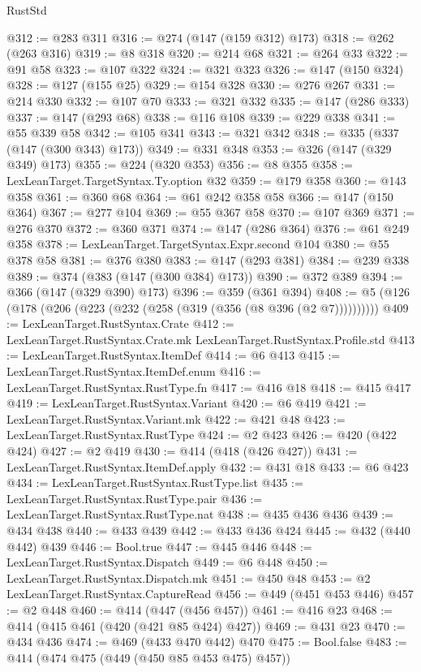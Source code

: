 \begin{lexlean}{RustStd}
\begin{coremodule}
{\begin{coremodule}
{{{{{{{{{{{{{@312 := @283 @311
@316 := @274 (@147 (@159 @312) @173)
@318 := @262 (@263 @316)
@319 := @8 @318
@320 := @214 @68
@321 := @264 @33
@322 := @91 @58
@323 := @107 @322
@324 := @321 @323
@326 := @147 (@150 @324)
@328 := @127 (@155 @25)
@329 := @154 @328
@330 := @276 @267
@331 := @214 @330
@332 := @107 @70
@333 := @321 @332
@335 := @147 (@286 @333)
@337 := @147 (@293 @68)
@338 := @116 @108
@339 := @229 @338
@341 := @55 @339 @58
@342 := @105 @341
@343 := @321 @342
@348 := @335 (@337 (@147 (@300 @343) @173))
@349 := @331 @348
@353 := @326 (@147 (@329 @349) @173)
@355 := @224 (@320 @353)
@356 := @8 @355
@358 := LexLeanTarget.TargetSyntax.Ty.option @32
@359 := @179 @358
@360 := @143 @358
@361 := @360 @68
@364 := @61 @242 @358 @58
@366 := @147 (@150 @364)
@367 := @277 @104
@369 := @55 @367 @58
@370 := @107 @369
@371 := @276 @370
@372 := @360 @371
@374 := @147 (@286 @364)
@376 := @61 @249 @358
@378 := LexLeanTarget.TargetSyntax.Expr.second @104
@380 := @55 @378 @58
@381 := @376 @380
@383 := @147 (@293 @381)
@384 := @239 @338
@389 := @374 (@383 (@147 (@300 @384) @173))
@390 := @372 @389
@394 := @366 (@147 (@329 @390) @173)
@396 := @359 (@361 @394)
@408 := @5 (@126 (@178 (@206 (@223 (@232 (@258 (@319 (@356 (@8 @396 (@2 @7))))))))))
@409 := LexLeanTarget.RustSyntax.Crate
@412 := LexLeanTarget.RustSyntax.Crate.mk LexLeanTarget.RustSyntax.Profile.std
@413 := LexLeanTarget.RustSyntax.ItemDef
@414 := @6 @413
@415 := LexLeanTarget.RustSyntax.ItemDef.enum
@416 := LexLeanTarget.RustSyntax.RustType.fn
@417 := @416 @18
@418 := @415 @417
@419 := LexLeanTarget.RustSyntax.Variant
@420 := @6 @419
@421 := LexLeanTarget.RustSyntax.Variant.mk
@422 := @421 @48
@423 := LexLeanTarget.RustSyntax.RustType
@424 := @2 @423
@426 := @420 (@422 @424)
@427 := @2 @419
@430 := @414 (@418 (@426 @427))
@431 := LexLeanTarget.RustSyntax.ItemDef.apply
@432 := @431 @18
@433 := @6 @423
@434 := LexLeanTarget.RustSyntax.RustType.list
@435 := LexLeanTarget.RustSyntax.RustType.pair
@436 := LexLeanTarget.RustSyntax.RustType.nat
@438 := @435 @436 @436
@439 := @434 @438
@440 := @433 @439
@442 := @433 @436 @424
@445 := @432 (@440 @442) @439
@446 := Bool.true
@447 := @445 @446
@448 := LexLeanTarget.RustSyntax.Dispatch
@449 := @6 @448
@450 := LexLeanTarget.RustSyntax.Dispatch.mk
@451 := @450 @48
@453 := @2 LexLeanTarget.RustSyntax.CaptureRead
@456 := @449 (@451 @453 @446)
@457 := @2 @448
@460 := @414 (@447 (@456 @457))
@461 := @416 @23
@468 := @414 (@415 @461 (@420 (@421 @85 @424) @427))
@469 := @431 @23
@470 := @434 @436
@474 := @469 (@433 @470 @442) @470
@475 := Bool.false
@483 := @414 (@474 @475 (@449 (@450 @85 @453 @475) @457))
}}}}}}}}}}}}}
\end{coremodule}}
\end{coremodule}
\end{lexlean}
